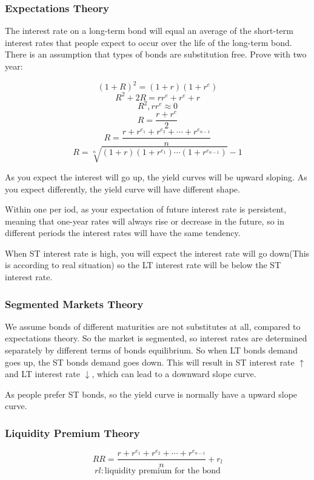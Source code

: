 \documentclass[10pt, a4paper]{article}
\begin{document}
    \subsubsection{Expectations Theory}
        The interest rate on a long-term bond will equal an average of the short-term interest rates that people expect to occur over the life of the long-term bond. There is an assumption that types of bonds are substitution free. Prove with two year: 

        $$(1 + R)^2 = (1 + r)(1 + r^e)$$
        $$R^2 + 2R = rr^e + r^e + r$$
        $$R^2, rr^e \approx 0$$
        $$R = \frac{r + r^e}{2}$$
        $$R = \frac{r + r^{e_1} + r^{e_2} + \cdots + r^{e_{n - 1}}}{n}$$
        $$R = \sqrt[n]{(1 + r)(1 + r^{e_1})\cdots(1 + r^{e_{n - 1}})} - 1$$

        As you expect the interest will go up, the yield curves will be upward sloping. As you expect differently, the yield curve will have different shape. 

        Within one per
        iod, as your expectation of future interest rate is persistent, meaning that one-year rates will always rise or decrease in the future, so in different periods the interest rates will have the same tendency. 

        When ST interest rate is high, you will expect the interest rate will go down(This is according to real situation) so the LT interest rate will be below the ST interest rate. 

    \subsubsection{Segmented Markets Theory}
        We assume bonds of different maturities are not substitutes at all, compared to expectations theory. So the market is segmented, so interest rates are determined separately by different terms of bonds equilibrium. So when LT bonds demand goes up, the ST bonds demand goes down. This will result in ST interest rate $\uparrow$ and LT interest rate $\downarrow$, which can lead to a downward slope curve.

        As people prefer ST bonds, so the yield curve is normally have a upward slope curve. 
    
    \subsubsection{Liquidity Premium Theory}

    $$RR = \frac{r + r^{e_1} + r^{e_2} + \cdots + r^{e_{n - 1}}}{n} + r_l$$
    $$rl:\text{liquidity premium for the bond}$$
\end{document}
